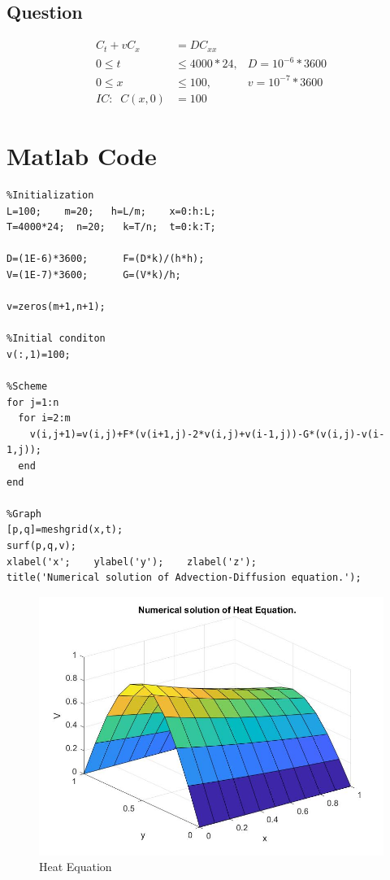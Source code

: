 \subsection{Question}
\begin{align*}
  C_t + vC_x &= D C_{xx} \\
  0 \leq t &\leq 4000*24,          &       D=10^{-6}*3600\\
  0 \leq x &\leq 100,          &       v=10^{-7}*3600\\
  IC: \;\; C(x,0) &= 100
\end{align*}

\section{Matlab Code}

\begin{verbatim}
%Initialization
L=100;    m=20;   h=L/m;    x=0:h:L;
T=4000*24;  n=20;   k=T/n;  t=0:k:T;

D=(1E-6)*3600;      F=(D*k)/(h*h);
V=(1E-7)*3600;      G=(V*k)/h;

v=zeros(m+1,n+1);

%Initial conditon
v(:,1)=100;

%Scheme
for j=1:n
  for i=2:m
    v(i,j+1)=v(i,j)+F*(v(i+1,j)-2*v(i,j)+v(i-1,j))-G*(v(i,j)-v(i-1,j));
  end
end

%Graph
[p,q]=meshgrid(x,t);
surf(p,q,v);
xlabel('x';    ylabel('y');    zlabel('z');
title('Numerical solution of Advection-Diffusion equation.');
\end{verbatim}
\begin{figure}
\centering
\includegraphics[scale=0.4]{heat.jpg}
\caption{Heat Equation}
\end{figure}
